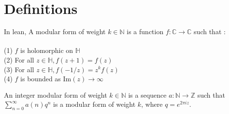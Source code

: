 




\section{Definitions}

\begin{definition} 
  \label{def:ModularForm}
  \leanok
  In lean, A modular form of weight $k \in \mathbb{N}$ is a function $f : \mathbb{C} → \mathbb{C}$ such that : \\ \\
  (1) $f$ is holomorphic on $\mathbb{H}$ \\
  (2) For all $z \in \mathbb{H}, f(z + 1) = f(z)$ \\
  (3) For all $z \in \mathbb{H}, f(-1/z) = z^{k} f(z)$ \\
  (4) $f$ is bounded as Im$(z) \to \infty$ \\
\end{definition}

\begin{definition} 
  \label{def:IntegerModularForm}
  \leanok
  An integer modular form of weight $k \in \mathbb{N}$ is a sequence $a : \mathbb{N} → \mathbb{Z}$
  such that $\sum_{n=0}^{\infty} a(n) q^n$ is a modular form of weight $k$, where $q = e ^ {2 \pi i z}.$
\end{definition}

